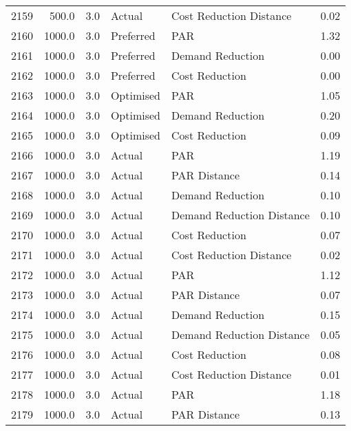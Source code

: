 \begin{longtable}{lrrllr}
2159 &        500.0 &     3.0 &         Actual &    Cost Reduction Distance &   0.02 \\
2160 &       1000.0 &     3.0 &      Preferred &                        PAR &   1.32 \\
2161 &       1000.0 &     3.0 &      Preferred &           Demand Reduction &   0.00 \\
2162 &       1000.0 &     3.0 &      Preferred &             Cost Reduction &   0.00 \\
2163 &       1000.0 &     3.0 &      Optimised &                        PAR &   1.05 \\
2164 &       1000.0 &     3.0 &      Optimised &           Demand Reduction &   0.20 \\
2165 &       1000.0 &     3.0 &      Optimised &             Cost Reduction &   0.09 \\
2166 &       1000.0 &     3.0 &         Actual &                        PAR &   1.19 \\
2167 &       1000.0 &     3.0 &         Actual &               PAR Distance &   0.14 \\
2168 &       1000.0 &     3.0 &         Actual &           Demand Reduction &   0.10 \\
2169 &       1000.0 &     3.0 &         Actual &  Demand Reduction Distance &   0.10 \\
2170 &       1000.0 &     3.0 &         Actual &             Cost Reduction &   0.07 \\
2171 &       1000.0 &     3.0 &         Actual &    Cost Reduction Distance &   0.02 \\
2172 &       1000.0 &     3.0 &         Actual &                        PAR &   1.12 \\
2173 &       1000.0 &     3.0 &         Actual &               PAR Distance &   0.07 \\
2174 &       1000.0 &     3.0 &         Actual &           Demand Reduction &   0.15 \\
2175 &       1000.0 &     3.0 &         Actual &  Demand Reduction Distance &   0.05 \\
2176 &       1000.0 &     3.0 &         Actual &             Cost Reduction &   0.08 \\
2177 &       1000.0 &     3.0 &         Actual &    Cost Reduction Distance &   0.01 \\
2178 &       1000.0 &     3.0 &         Actual &                        PAR &   1.18 \\
2179 &       1000.0 &     3.0 &         Actual &               PAR Distance &   0.13 \\

\end{longtable}
